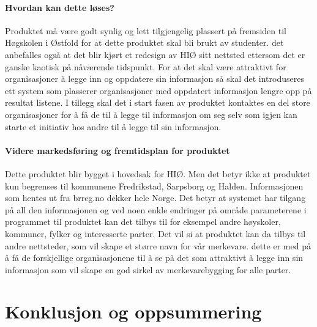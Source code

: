 \paragraph{Hvordan kan dette løses?}

Produktet må være godt synlig og lett tilgjengelig plassert på fremsiden til Høgskolen i Østfold for at dette produktet skal bli brukt av studenter. det anbefalles også at det blir kjørt et redesign av HIØ sitt nettsted ettersom det er ganske kaotisk på nåværende tidspunkt. For at det skal være attraktivt for organisasjoner å legge inn og oppdatere sin informasjon så skal det introduseres ett system som plasserer organisasjoner med oppdatert informasjon lengre opp på resultat listene. I tillegg skal det i start fasen av produktet kontaktes en del store organisasjoner for å få de til å legge til informasjon om seg selv som igjen kan starte et initiativ hos andre til å legge til sin informasjon. 

\paragraph{Videre markedsføring og fremtidsplan for produktet}

Dette produktet blir bygget i hovedsak for HIØ. Men det betyr ikke at produktet kun begrenses til kommunene Fredrikstad, Sarpsborg og Halden. Informasjonen som hentes ut fra brreg.no dekker hele Norge. Det betyr at systemet har tilgang på all den informasjonen og ved noen enkle endringer på område parameterene i programmet til produktet kan det tilbys til for eksempel andre høyskoler, kommuner, fylker og interesserte parter. Det vil si at produktet kan da tilbys til andre nettsteder, som vil skape et større navn for vår merkevare. dette er med på å få de forskjellige organisasjonene til å se på det som attraktivt å legge inn sin informasjon som vil skape en god sirkel av merkevarebygging for alle parter. 


\section{Konklusjon og oppsummering}







